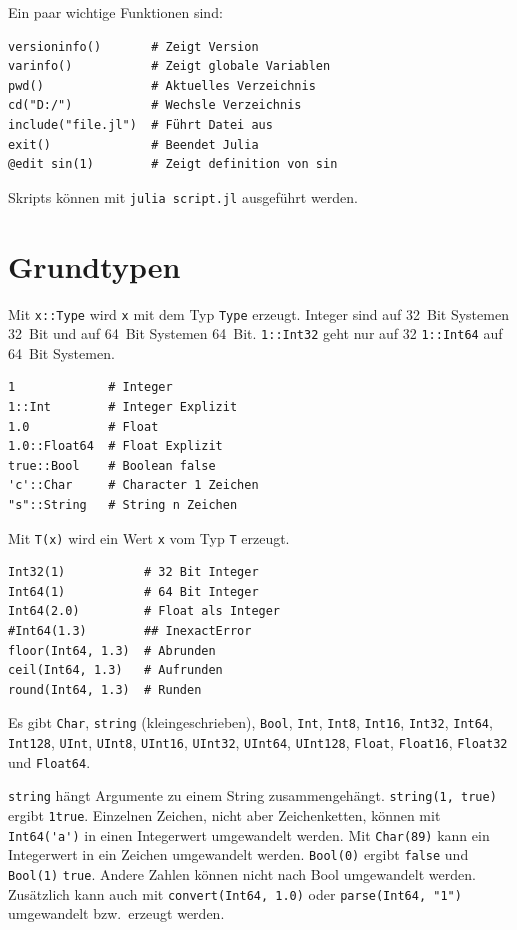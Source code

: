 \documentclass[10pt,twocolumn]{scrartcl}
\begin{document}
Ein paar wichtige Funktionen sind:

\begin{lstlisting}
versioninfo()       # Zeigt Version
varinfo()           # Zeigt globale Variablen
pwd()               # Aktuelles Verzeichnis
cd("D:/")           # Wechsle Verzeichnis
include("file.jl")  # Führt Datei aus
exit()              # Beendet Julia
@edit sin(1)        # Zeigt definition von sin
\end{lstlisting}

Skripts können mit \lstinline|julia script.jl| ausgeführt werden.

\section{Grundtypen}
\label{sec:grundtypen}

Mit \lstinline|x::Type| wird \lstinline|x| mit dem Typ \lstinline|Type| erzeugt.
Integer sind auf 32~Bit Systemen 32~Bit und auf 64~Bit Systemen 64~Bit.
\lstinline|1::Int32| geht nur auf 32 \lstinline|1::Int64| auf 64~Bit Systemen. 

\begin{lstlisting}
1             # Integer
1::Int        # Integer Explizit
1.0           # Float
1.0::Float64  # Float Explizit
true::Bool    # Boolean false
'c'::Char     # Character 1 Zeichen
"s"::String   # String n Zeichen
\end{lstlisting}

Mit \lstinline|T(x)| wird ein Wert \lstinline|x| vom Typ \lstinline|T| erzeugt.

\begin{lstlisting}
Int32(1)           # 32 Bit Integer
Int64(1)           # 64 Bit Integer
Int64(2.0)         # Float als Integer
#Int64(1.3)        ## InexactError
floor(Int64, 1.3)  # Abrunden
ceil(Int64, 1.3)   # Aufrunden
round(Int64, 1.3)  # Runden
\end{lstlisting}

Es gibt
\lstinline|Char|,
\lstinline|string| (kleingeschrieben),
\lstinline|Bool|,
\lstinline|Int|,
 \lstinline|Int8|,
\lstinline|Int16|,
\lstinline|Int32|,
\lstinline|Int64|,
\lstinline|Int128|,
\lstinline|UInt|,
\lstinline|UInt8|,
\lstinline|UInt16|,
\lstinline|UInt32|,
\lstinline|UInt64|,
\lstinline|UInt128|,
\lstinline|Float|,
\lstinline|Float16|,
\lstinline|Float32| und
\lstinline|Float64|.

\lstinline|string| hängt Argumente zu einem String zusammengehängt.
\lstinline|string(1, true)| ergibt \lstinline|1true|. Einzelnen Zeichen, nicht
aber Zeichenketten, können mit \lstinline|Int64('a')| in einen Integerwert
umgewandelt werden. Mit \lstinline|Char(89)| kann ein Integerwert in ein Zeichen
umgewandelt werden. \lstinline|Bool(0)| ergibt \lstinline|false| und
\lstinline|Bool(1)| \lstinline|true|. Andere Zahlen können nicht nach Bool
umgewandelt werden. Zusätzlich kann auch mit \lstinline|convert(Int64, 1.0)|
oder \lstinline|parse(Int64, "1")| umgewandelt bzw.\ erzeugt werden.
\end{document}
